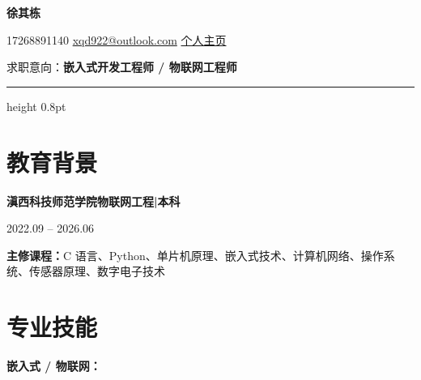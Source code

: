 \documentclass[10pt,a4paper]{article}
\begin{document}
\begin{center}
    {\fontsize{26}{32}\selectfont\bfseries\color{primary} 徐其栋}

    \vspace{0.15em}

    {\color{graytext}
    \faPhone\hspace{0.3em}17268891140
    \hspace{1.2em}
    \faEnvelope\hspace{0.3em}\href{mailto:xqd922@outlook.com}{xqd922@outlook.com}
    \hspace{1.2em}
    \faGlobe\hspace{0.3em}\href{https://1001.pp.ua}{个人主页}}

    \vspace{0.5em}

    {\color{darktext} 求职意向：\textbf{\color{primary}嵌入式开发工程师 / 物联网工程师}}
\end{center}

\vspace{0.2em}
{\color{rulecolor}\hrule height 0.8pt}

\section{\faGraduationCap\hspace{0.4em}教育背景}

{\bfseries 滇西科技师范学院}\hfill{\bfseries 物联网工程\hspace{0.3em}|\hspace{0.3em}本科}

{\color{graytext} 2022.09 -- 2026.06}

\vspace{0.2em}

{\color{darktext}
\textbf{主修课程：}C 语言、Python、单片机原理、嵌入式技术、计算机网络、操作系统、传感器原理、数字电子技术
}

\section{\faCogs\hspace{0.4em}专业技能}

{\bfseries\color{primary}嵌入式 / 物联网：}
\end{document}
